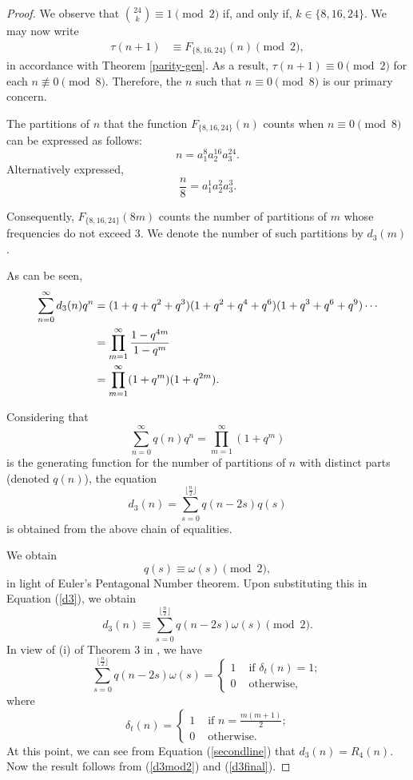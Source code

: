 \documentclass[10pt]{article}
\theoremstyle{definition}
\begin{document}
\begin{proof}
We observe that ${24\choose k}\equiv 1\pmod 2$ if, and only if, $k\in\{8,16,24\}$. 
We may now write \begin{align*} \tau(n+1)&\equiv F_{\{8,16,24\}}(n)\pmod{2}, \end{align*} in accordance with Theorem \ref{parity-gen}.
As a result, $\tau(n+1)\equiv 0\pmod{2}$ for each $n\not\equiv 0\pmod{8}$. Therefore, the $n$ such that $n\equiv 0\pmod{8}$ is our primary concern.

The partitions of $n$ that the function $F_{\{8,16,24\}}(n)$ counts when $n\equiv 0\pmod{8}$ can be expressed as follows: \[n=a_1^8a_2^{16}a_3^{24}.\]
Alternatively expressed, \[\frac{n}{8}=a_1^1a_2^{2}a_3^{3}. \]

Consequently, $F_{\{8,16,24\}}(8m)$ counts the number of partitions of $m$ whose frequencies do not exceed $3$. We denote the number of such partitions by $d_3(m)$.

As can be seen,
\begin{align}
\notag \sum_{n=0}^{\infty}d_3(n)q^n&=(1+q+q^2+q^3)(1+q^2+q^4+q^6)(1+q^3+q^6+q^9)\cdots \\ 
&=\prod_{m=1}^{\infty}\frac{1-q^{4m}}{1-q^m}\label{secondline}\\
&\notag =\prod_{m=1}^{\infty}(1+q^m)(1+q^{2m}).
\end{align}

Considering that 
\[
\sum\limits_{n=0}^{\infty}q(n)q^n=\prod_{m=1}^{\infty}(1+q^m)
\] is the generating function for the number of partitions of $n$ with distinct parts (denoted $q(n)$), the equation 
\begin{equation}\label{d3}
d_3(n)=\sum_{s=0}^{\lfloor\frac{n}{2}\rfloor}q(n-2s)q(s) 
\end{equation}
is obtained from the above chain of equalities. 

We obtain \[q(s)\equiv \omega(s)\pmod 2,\] in light of Euler's Pentagonal Number theorem. Upon substituting this in Equation (\ref{d3}), we obtain
\begin{equation}\label{d3mod2}
d_3(n)\equiv \sum_{s=0}^{\lfloor\frac{n}{2}\rfloor}q(n-2s)\omega(s)\pmod 2.
\end{equation}
In view of (i) of Theorem 3 in \cite{david}, we have
\begin{equation}\label{d3final}
\sum_{s=0}^{\lfloor\frac{n}{2}\rfloor}q(n-2s)\omega(s)=\begin{cases}
1&\text{ if $\delta_t(n)=1$};\\ 
0&\text{ otherwise,}
\end{cases}
\end{equation}
where
\[\delta_t(n)=\begin{cases}
1&\text{ if $n=\frac{m(m+1)}{2}$;}\\
0&\text{ otherwise.}
\end{cases}
\]
At this point, we can see from Equation (\ref{secondline}) that $d_3(n)=R_4(n)$. Now the result follows from (\ref{d3mod2}) and (\ref{d3final}).
\end{proof}
\end{document}
